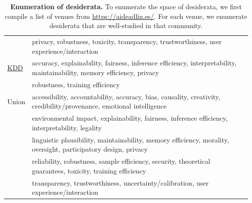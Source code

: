 \begin{table}[htp]
{\begin{tabular}{ll}
& privacy, robustness, toxicity, transparency, trustworthiness, user experience/interaction \\
\href{https://kdd.org/kdd2022/cfpResearch.html}{KDD} & accuracy, explainability, fairness, inference efficiency, interpretability, maintainability, memory efficiency, privacy \\
& robustness, training efficiency \\
\midrule 
Union & accessibility, accountability, accuracy, bias, causality, creativity, credibility/provenance, emotional intelligence \\
& environmental impact, explainability, fairness, inference efficiency, interpretability, legality \\
& linguistic plausibility, maintainability, memory efficiency, morality, oversight, participatory design, privacy \\
& reliability, robustness, sample efficiency, security, theoretical guarantees, toxicity, training efficiency \\
& transparency, trustworthiness, uncertainty/calibration, user experience/interaction \\
\bottomrule 
\end{tabular}}
\caption{\textbf{Enumeration of desiderata.} To enumerate the space of desiderata, we first compile a list of venues from \url{https://aideadlin.es/}. For each venue, we enumerate desiderata that are well-studied in that community.}
\label{tab:desiderata-enumeration}
\end{table}



